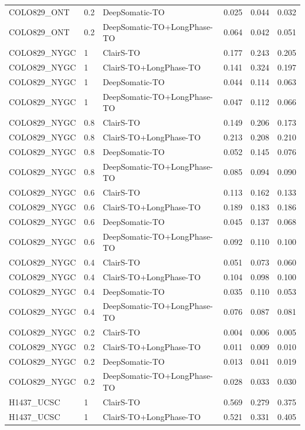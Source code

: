 \documentclass[pdflatex,sn-nature]{sn-jnl}
\begin{document}
{\begin{longtable}{@{}lllccc@{}}
  COLO829\_ONT & 0.2 & DeepSomatic-TO & 0.025 & 0.044 & 0.032 \\
  COLO829\_ONT & 0.2 & DeepSomatic-TO+LongPhase-TO & 0.064 & 0.042 & 0.051 \\
  COLO829\_NYGC & 1 & ClairS-TO & 0.177 & 0.243 & 0.205 \\
  COLO829\_NYGC & 1 & ClairS-TO+LongPhase-TO & 0.141 & 0.324 & 0.197 \\
  COLO829\_NYGC & 1 & DeepSomatic-TO & 0.044 & 0.114 & 0.063 \\
  COLO829\_NYGC & 1 & DeepSomatic-TO+LongPhase-TO & 0.047 & 0.112 & 0.066 \\
  COLO829\_NYGC & 0.8 & ClairS-TO & 0.149 & 0.206 & 0.173 \\
  COLO829\_NYGC & 0.8 & ClairS-TO+LongPhase-TO & 0.213 & 0.208 & 0.210 \\
  COLO829\_NYGC & 0.8 & DeepSomatic-TO & 0.052 & 0.145 & 0.076 \\
  COLO829\_NYGC & 0.8 & DeepSomatic-TO+LongPhase-TO & 0.085 & 0.094 & 0.090 \\
  COLO829\_NYGC & 0.6 & ClairS-TO & 0.113 & 0.162 & 0.133 \\
  COLO829\_NYGC & 0.6 & ClairS-TO+LongPhase-TO & 0.189 & 0.183 & 0.186 \\
  COLO829\_NYGC & 0.6 & DeepSomatic-TO & 0.045 & 0.137 & 0.068 \\
  COLO829\_NYGC & 0.6 & DeepSomatic-TO+LongPhase-TO & 0.092 & 0.110 & 0.100 \\
  COLO829\_NYGC & 0.4 & ClairS-TO & 0.051 & 0.073 & 0.060 \\
  COLO829\_NYGC & 0.4 & ClairS-TO+LongPhase-TO & 0.104 & 0.098 & 0.100 \\
  COLO829\_NYGC & 0.4 & DeepSomatic-TO & 0.035 & 0.110 & 0.053 \\
  COLO829\_NYGC & 0.4 & DeepSomatic-TO+LongPhase-TO & 0.076 & 0.087 & 0.081 \\
  COLO829\_NYGC & 0.2 & ClairS-TO & 0.004 & 0.006 & 0.005 \\
  COLO829\_NYGC & 0.2 & ClairS-TO+LongPhase-TO & 0.011 & 0.009 & 0.010 \\
  COLO829\_NYGC & 0.2 & DeepSomatic-TO & 0.013 & 0.041 & 0.019 \\
  COLO829\_NYGC & 0.2 & DeepSomatic-TO+LongPhase-TO & 0.028 & 0.033 & 0.030 \\
  H1437\_UCSC & 1 & ClairS-TO & 0.569 & 0.279 & 0.375 \\
  H1437\_UCSC & 1 & ClairS-TO+LongPhase-TO & 0.521 & 0.331 & 0.405 \\

\end{longtable}}
\end{document}
